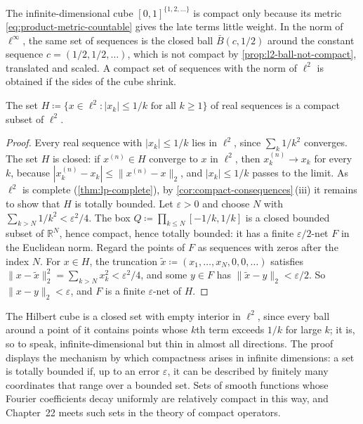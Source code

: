 The infinite-dimensional cube $[0,1]^{\{1,2,\ldots\}}$ is compact only because its metric \eqref{eq:product-metric-countable} gives the late terms little weight. In the norm of $\ell^\infty$, the same set of sequences is the closed ball $\bar B(c,1/2)$ around the constant sequence $c=(1/2,1/2,\ldots)$, which is not compact by \cref{prop:l2-ball-not-compact}, translated and scaled. A compact set of sequences with the norm of $\ell^2$ is obtained if the sides of the cube shrink.

\begin{proposition}
\label{prop:hilbert-cube}
The set $H\coloneqq\{x\in\ell^2: |x_k|\le1/k\text{ for all }k\ge1\}$ of real sequences is a compact subset of $\ell^2$.
\end{proposition}

\begin{proof}
Every real sequence with $|x_k|\le1/k$ lies in $\ell^2$, since $\sum_k1/k^2$ converges. The set $H$ is closed: if $x^{(n)}\in H$ converge to $x$ in $\ell^2$, then $x^{(n)}_k\to x_k$ for every $k$, because $|x^{(n)}_k-x_k|\le\|x^{(n)}-x\|_2$, and $|x_k|\le1/k$ passes to the limit. As $\ell^2$ is complete (\cref{thm:lp-complete}), by \cref{cor:compact-consequences}\,(iii) it remains to show that $H$ is totally bounded. Let $\varepsilon>0$ and choose $N$ with $\sum_{k>N}1/k^2<\varepsilon^2/4$. The box $Q\coloneqq\prod_{k\le N}[-1/k,1/k]$ is a closed bounded subset of $\mathbb R^N$, hence compact, hence totally bounded: it has a finite $\varepsilon/2$-net $F$ in the Euclidean norm. Regard the points of $F$ as sequences with zeros after the index $N$. For $x\in H$, the truncation $\tilde x\coloneqq(x_1,\ldots,x_N,0,0,\ldots)$ satisfies $\|x-\tilde x\|_2^2=\sum_{k>N}x_k^2<\varepsilon^2/4$, and some $y\in F$ has $\|\tilde x-y\|_2<\varepsilon/2$. So $\|x-y\|_2<\varepsilon$, and $F$ is a finite $\varepsilon$-net of $H$.
\end{proof}

The Hilbert cube is a closed set with empty interior in $\ell^2$, since every ball around a point of it contains points whose $k$th term exceeds $1/k$ for large $k$; it is, so to speak, infinite-dimensional but thin in almost all directions. The proof displays the mechanism by which compactness arises in infinite dimensions: a set is totally bounded if, up to an error $\varepsilon$, it can be described by finitely many coordinates that range over a bounded set. Sets of smooth functions whose Fourier coefficients decay uniformly are relatively compact in this way, and Chapter~22 meets such sets in the theory of compact operators.

